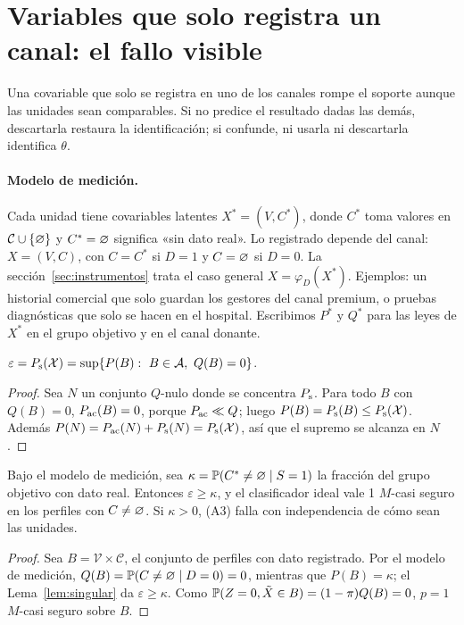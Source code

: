 \section{Variables que solo registra un canal: el fallo visible}\label{sec:canal}

Una covariable que solo se registra en uno de los canales rompe el soporte aunque las unidades sean comparables. Si no predice el resultado dadas las demás, descartarla restaura la identificación; si confunde, ni usarla ni descartarla identifica $\theta$.

\paragraph{Modelo de medición.} Cada unidad tiene covariables latentes $X^*=(V,C^*)$, donde $C^*$ toma valores en $\mathcal C\cup\{\varnothing\}$ y $C^*=\varnothing$ significa «sin dato real». Lo registrado depende del canal: $X=(V,C)$, con $C=C^*$ si $D=1$ y $C=\varnothing$ si $D=0$. La sección~\ref{sec:instrumentos} trata el caso general $X=\varphi_D(X^*)$. Ejemplos: un historial comercial que solo guardan los gestores del canal premium, o pruebas diagnósticas que solo se hacen en el hospital. Escribimos $P^*$ y $Q^*$ para las leyes de $X^*$ en el grupo objetivo y en el canal donante.

\begin{lema}\label{lem:singular}
$\varepsilon=\Ps(\X)=\sup\{P(B):\ B\in\A,\ Q(B)=0\}$.
\end{lema}
\begin{proof}
Sea $N$ un conjunto $Q$-nulo donde se concentra $P_{\mathrm{s}}$. Para todo $B$ con $Q(B)=0$, $P_{\mathrm{ac}}(B)=0$, porque $P_{\mathrm{ac}}\ll Q$; luego $P(B)=P_{\mathrm{s}}(B)\le P_{\mathrm{s}}(\mathcal{X})$. Además $P(N)=P_{\mathrm{ac}}(N)+P_{\mathrm{s}}(N)=P_{\mathrm{s}}(\mathcal{X})$, así que el supremo se alcanza en $N$.
\end{proof}

\begin{proposicion}\label{prop:rompe}
Bajo el modelo de medición, sea $\kappa=\mathbb{P}(C^*\ne\varnothing\mid S=1)$ la fracción del grupo objetivo con dato real. Entonces $\varepsilon\ge\kappa$, y el clasificador ideal vale 1 $M$-casi seguro en los perfiles con $C\ne\varnothing$. Si $\kappa>0$, (A3) falla con independencia de cómo sean las unidades.
\end{proposicion}
\begin{proof}
Sea $B=\mathcal V\times\mathcal C$, el conjunto de perfiles con dato registrado. Por el modelo de medición, $Q(B)=\mathbb{P}(C\ne\varnothing\mid D=0)=0$, mientras que $P(B)=\kappa$; el Lema~\ref{lem:singular} da $\varepsilon\ge\kappa$. Como $\mathbb{P}(Z=0,\tilde X\in B)=(1-\pi)Q(B)=0$, $p=1$ $M$-casi seguro sobre $B$.
\end{proof}


